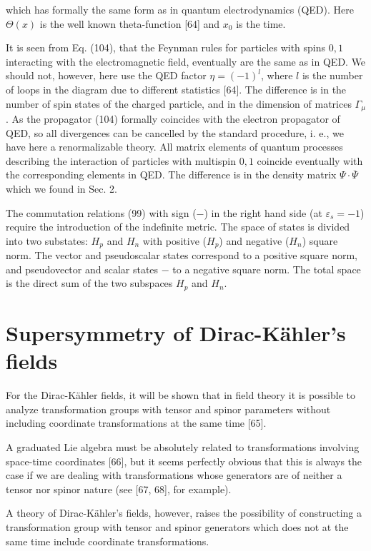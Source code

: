 \documentclass[a4paper,12pt]{article}
\begin{document}
which has formally the same form as in quantum electrodynamics
(QED). Here $ \Theta (x)$ is the well known theta-function [64]
and $x_0$ is the time.

It is seen from Eq. (104), that the Feynman rules for particles
with spins $ 0,1$ interacting with the electromagnetic field,
eventually are the same as in QED. We should not, however, here
use the QED factor $\eta =(-1)^l$, where $l$ is the number of
loops in the diagram due to different statistics [64]. The
difference is in the number of spin states of the charged
particle, and in the dimension of matrices $\Gamma _\mu $. As the
propagator (104) formally coincides with the electron propagator
of QED, so all divergences can be cancelled by the standard
procedure, i. e., we have here a renormalizable theory. All matrix
elements of quantum processes describing the interaction of
particles with multispin $0,1$ coincide eventually with the
corresponding elements in QED. The difference is in the density
matrix $ \Psi \cdot \overline{\Psi }$ which we found in Sec. 2.

The commutation relations (99) with sign ($-$) in the right hand
side (at $ \varepsilon _s=-1$) require the introduction of the
indefinite metric. The space of states is divided into two
substates: $H_p$ and $H_n$ with positive ($H_p$) and negative
($H_n$) square norm. The vector and pseudoscalar states correspond
to a positive square norm, and pseudovector and scalar states $-$
to a negative square norm. The total space is the direct sum of
the two subspaces $H_p$ and $H_n$.

\section{Supersymmetry of Dirac-K\"ahler's fields}

For the Dirac-K\"ahler fields, it will be shown that in field theory it is
possible to analyze transformation groups with tensor and spinor parameters
without including coordinate transformations at the same time [65].

A graduated Lie algebra must be absolutely related to transformations
involving space-time coordinates [66], but it seems perfectly obvious that
this is always the case if we are dealing with transformations whose
generators are of neither a tensor nor spinor nature (see [67, 68], for
example).

A theory of Dirac-K\"ahler's fields, however, raises the possibility of
constructing a transformation group with tensor and spinor generators which
does not at the same time include coordinate transformations.
\end{document}
